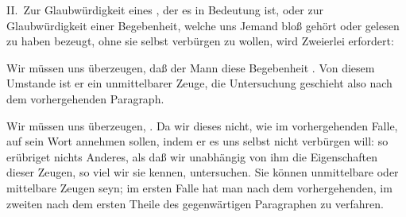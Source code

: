 \vabst II.~Zur Glaubwürdigkeit eines , der es in  Bedeutung ist, oder zur Glaubwürdigkeit einer Begebenheit, welche uns Jemand bloß gehört oder gelesen zu haben bezeugt, ohne sie selbst verbürgen zu wollen, wird Zweierlei erfordert:
\begin{aufza}
\item Wir müssen uns überzeugen, daß der Mann diese Begebenheit . Von diesem Umstande ist er ein unmittelbarer Zeuge, die Untersuchung geschieht also nach dem vorhergehenden Paragraph.
\item Wir müssen uns überzeugen, . Da wir dieses nicht, wie im vorhergehenden Falle, auf sein Wort annehmen sollen, indem er es uns selbst nicht verbürgen will: so erübriget nichts Anderes, als daß wir unabhängig von ihm die Eigenschaften dieser Zeugen, so viel wir sie kennen, untersuchen. Sie können unmittelbare oder mittelbare Zeugen seyn; im ersten Falle hat man nach dem vorhergehenden, im zweiten nach dem ersten Theile des gegenwärtigen Paragraphen zu verfahren.~
\end{aufza}

